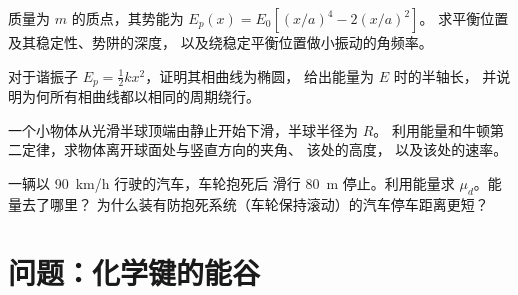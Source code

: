 \begin{exercise}[$\star\star$]\label{exo:b1:work-and-energy:9}
质量为 $m$ 的质点，其势能为 $E_p(x) = E_0[(x/a)^4 - 2(x/a)^2]$。
求平衡位置及其稳定性、势阱的深度，
以及绕稳定平衡位置做小振动的角频率。
\end{exercise}

\begin{exercise}[$\star\star\star$]\label{exo:b1:work-and-energy:10}
对于谐振子 $E_p = \tfrac12 kx^2$，证明其相曲线为椭圆，
给出能量为 $E$ 时的半轴长，
并说明为何所有相曲线都以相同的周期绕行。
\end{exercise}

\begin{exercise}[$\star\star\star$]\label{exo:b1:work-and-energy:11}
一个小物体从光滑半球顶端由静止开始下滑，半球半径为 $R$。
利用能量和牛顿第二定律，求物体离开球面处与竖直方向的夹角、
该处的高度，
以及该处的速率。
\end{exercise}

\begin{exercise}[$\star\star\star$]\label{exo:b1:work-and-energy:12}
一辆以 \qty{90}{km/h} 行驶的汽车，车轮抱死后
滑行 \qty{80}{m} 停止。利用能量求 $\mu_d$。能量去了哪里？
为什么装有防抱死系统（车轮保持滚动）的汽车停车距离更短？
\end{exercise}

\section{问题：化学键的能谷}

